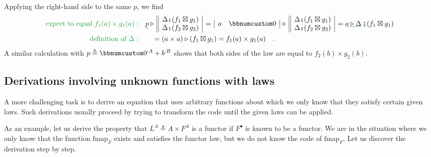 Applying the right-hand side to the same $p$, we find
\begin{align*}
{\color{greenunder}\text{expect to equal }f_{1}(a)\times g_{1}(a):}\quad & \gunderline p\triangleright\,\begin{array}{||c|}
\Delta\bef(f_{1}\boxtimes g_{1})\\
\Delta\bef(f_{2}\boxtimes g_{2})
\end{array}\,=\,\begin{array}{|cc|}
a & \bbnum 0\end{array}\,\triangleright\,\begin{array}{||c|}
\Delta\bef(f_{1}\boxtimes g_{1})\\
\Delta\bef(f_{2}\boxtimes g_{2})
\end{array}\,=\gunderline{a\triangleright\Delta}\,\bef(f_{1}\boxtimes g_{1})\\
{\color{greenunder}\text{definition of }\Delta:}\quad & \quad=(a\times a)\triangleright(f_{1}\boxtimes g_{1})=f_{1}(a)\times g_{1}(a)\quad.
\end{align*}
A similar calculation with $p\triangleq\bbnum 0^{:A}+b^{:B}$ shows
that both sides of the law are equal to $f_{2}(b)\times g_{2}(b)$.

\subsection{Derivations involving unknown functions with laws}

A more challenging task is to derive an equation that uses arbitrary
functions about which we only know that they satisfy certain given
laws. Such derivations usually proceed by trying to transform the
code until the given laws can be applied.

As an example, let us derive the property that $L^{A}\triangleq A\times F^{A}$
is a functor if $F^{\bullet}$ is known to be a functor. We are in
the situation where we only know that the function $\text{fmap}_{F}$
exists and satisfies the functor law, but we do not know the code
of $\text{fmap}_{F}$. Let us discover the derivation step by step.

